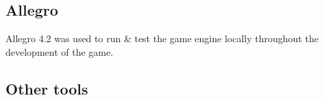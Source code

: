 \subsection{Allegro}
	Allegro 4.2 was used to run & test the game engine locally throughout the development of the game.

\subsection{Other tools}
